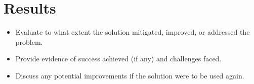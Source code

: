 \section{Results}

\begin{itemize}

    \item [-] Evaluate to what extent the solution mitigated, improved, or addressed the problem.
    \item [-] Provide evidence of success achieved (if any) and challenges faced.
    \item [-] Discuss any potential improvements if the solution were to be used again.

\end{itemize}